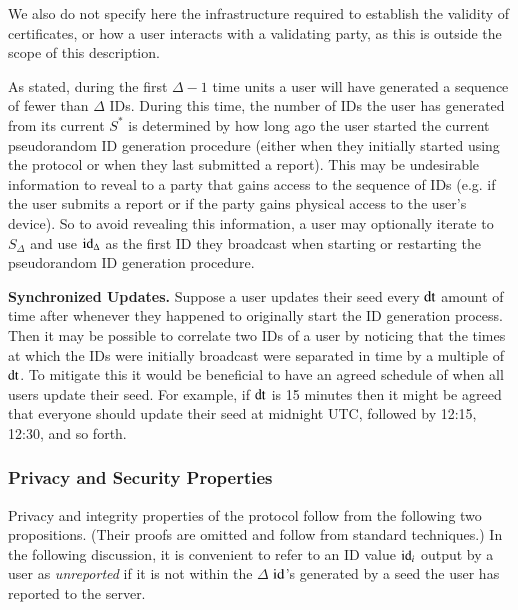 We also do not specify here the infrastructure required to establish the validity of certificates, or how a user interacts with a validating party, as this is outside the scope of this description. 

As stated, during the first $\Delta-1$ time units a user will have generated a sequence of fewer than $\Delta$ IDs.
During this time, the number of IDs the user has generated from its current $S^\ast$ is determined by how long ago the user started the current pseudorandom ID generation procedure (either when they initially started using the protocol or when they last submitted a report).   
This may be undesirable information to reveal to a party that gains access to the sequence of IDs (e.g. if the user submits a report or if the party gains physical access to the user's device). 
So to avoid revealing this information, a user may optionally iterate to $S_{\Delta}$ and use $\mathrm{id}_{\Delta}$ as the first ID they broadcast when starting or restarting the pseudorandom ID generation procedure.

{\bf Synchronized Updates.}
Suppose a user updates their seed every $\mathrm{dt}$ amount of time after whenever they happened to originally start the ID generation process.
Then it may be possible to correlate two IDs of a user by noticing that the times at which the IDs were initially broadcast were separated in time by a multiple of $\mathrm{dt}$.
To mitigate this it would be beneficial to have an agreed schedule of when all users update their seed.
For example, if $\mathrm{dt}$ is 15 minutes then it might be agreed that everyone should update their seed at midnight UTC, followed by 12:15, 12:30, and so forth.



\subsubsection{Privacy and Security Properties}

Privacy and integrity properties of the protocol follow from the following two propositions. (Their proofs are omitted and follow from standard techniques.) In the following discussion, it is convenient to refer to an ID value $\mathrm{id}_i$ output by a user as {\em unreported} if it is not within the $\Delta$ $\mathrm{id}$'s generated by a seed the user has reported to the server. 

